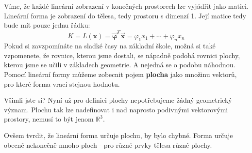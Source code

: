 \documentclass[a5paper,12pt]{amsbook}
\theoremstyle{definition}
\newcommand{\myscalar}[1]{#1}
\newcommand{\myvec}[1]{\mathbf{#1}}
\newcommand{\mycoord}[1]{\overrightarrow{\mathbf{#1}}}
\newcommand{\mymap}[1]{#1}
\begin{document}
Víme, že každé lineární zobrazení v konečných prostorech lze vyjádřit jako matici. Lineární forma
je zobrazení do tělesa, tedy prostoru s dimenzí 1. Její matice tedy bude mít pouze jednu řádku:
\begin{equation*}
\myscalar{K}=\mymap{L}(\myvec{x}) = \mycoord{\varphi}^T\mycoord{x} = \myscalar{\varphi_1}\myscalar{x_1} + \cdots + \myscalar{\varphi_n}\myscalar{x_n}
\end{equation*}
Pokud si zavzpomínáte na sladké časy na základní škole, možná si také vzpomenete, že rovnice, kterou
jsme dostali, se nápadně podobá rovnici plochy, kterou jsme se učili v základech geometrie. A nejedná
se o podobu náhodnou. Pomocí lineární formy můžeme zobecnit pojem \textbf{plocha} jako množinu vektorů,
pro které forma vrací stejnou hodnotu.

Všimli jste si? Nyní už pro definici plochy nepotřebujeme žádný geometrický význam. Plochu tak
lze nadefinovat i nad naprosto podivnými vektorovými prostory, nemusí to být jenom $\mathbb{R}^3$.

Ovšem tvrdit, že lineární forma určuje plochu, by bylo chybné. Forma určuje obecně nekonečně mnoho
ploch - pro různé prvky tělesa různé plochy.
\end{document}

